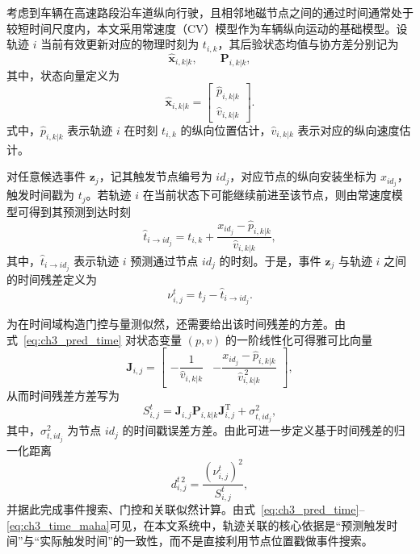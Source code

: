 \documentclass{xdupgthesis}
\begin{document}
考虑到车辆在高速路段沿车道纵向行驶，且相邻地磁节点之间的通过时间通常处于较短时间尺度内，本文采用常速度（CV）模型作为车辆纵向运动的基础模型。设轨迹 $i$ 当前有效更新对应的物理时刻为 $t_{i,k}$，其后验状态均值与协方差分别记为
\begin{equation}
	\hat{\mathbf x}_{i,k|k},
	\qquad
	\mathbf P_{i,k|k},
	\label{eq:ch3_post_state}
\end{equation}
其中，状态向量定义为
\begin{equation}
	\hat{\mathbf x}_{i,k|k}=
	\begin{bmatrix}
		\hat p_{i,k|k}\\
		\hat v_{i,k|k}
	\end{bmatrix}.
	\label{eq:ch3_state_vec}
\end{equation}
式中，$\hat p_{i,k|k}$ 表示轨迹 $i$ 在时刻 $t_{i,k}$ 的纵向位置估计，$\hat v_{i,k|k}$ 表示对应的纵向速度估计。

对任意候选事件 $\mathbf z_j$，记其触发节点编号为 $id_j$，对应节点的纵向安装坐标为 $x_{id_j}$，触发时间戳为 $t_j$。若轨迹 $i$ 在当前状态下可能继续前进至该节点，则由常速度模型可得到其预测到达时刻
\begin{equation}
	\hat t_{i\rightarrow id_j}
	=
	t_{i,k}
	+
	\frac{x_{id_j}-\hat p_{i,k|k}}{\hat v_{i,k|k}},
	\label{eq:ch3_pred_time}
\end{equation}
其中，$\hat t_{i\rightarrow id_j}$ 表示轨迹 $i$ 预测通过节点 $id_j$ 的时刻。于是，事件 $\mathbf z_j$ 与轨迹 $i$ 之间的时间残差定义为
\begin{equation}
	\nu^{t}_{i,j}
	=
	t_j-\hat t_{i\rightarrow id_j}.
	\label{eq:ch3_time_residual}
\end{equation}

为在时间域构造门控与量测似然，还需要给出该时间残差的方差。由式~\eqref{eq:ch3_pred_time} 对状态变量 $(p,v)$ 的一阶线性化可得雅可比向量
\begin{equation}
	\mathbf J_{i,j}
	=
	\begin{bmatrix}
		-\dfrac{1}{\hat v_{i,k|k}}
		&
		-\dfrac{x_{id_j}-\hat p_{i,k|k}}{\hat v_{i,k|k}^{\,2}}
	\end{bmatrix},
	\label{eq:ch3_time_jacobian}
\end{equation}
从而时间残差方差写为
\begin{equation}
	S^{t}_{i,j}
	=
	\mathbf J_{i,j}\mathbf P_{i,k|k}\mathbf J_{i,j}^{\mathrm T}
	+
	\sigma_{t,id_j}^2,
	\label{eq:ch3_time_var}
\end{equation}
其中，$\sigma_{t,id_j}^2$ 为节点 $id_j$ 的时间戳误差方差。由此可进一步定义基于时间残差的归一化距离
\begin{equation}
	d^{t\,2}_{i,j}
	=
	\frac{\left(\nu^{t}_{i,j}\right)^2}{S^{t}_{i,j}},
	\label{eq:ch3_time_maha}
\end{equation}
并据此完成事件搜索、门控和关联似然计算。由式~\eqref{eq:ch3_pred_time}--\eqref{eq:ch3_time_maha}可见，在本文系统中，轨迹关联的核心依据是“预测触发时间”与“实际触发时间”的一致性，而不是直接利用节点位置戳做事件搜索。
\end{document}
